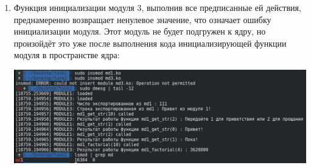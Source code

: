 \documentclass[a4paper,14pt]{extreport} %
\begin{document}
\begin{enumerate}
\item Функция инициализации модуля 3, выполнив все предписанные ей действия, преднамеренно возвращает ненулевое значение, что означает ошибку инициализации модуля. Этот модуль не будет подгружен к ядру, но произойдёт это уже после выполнения кода инициализирующей функции модуля в пространстве ядра:

\includegraphics[scale=0.45]{6}
\end{enumerate}
\end{document}

